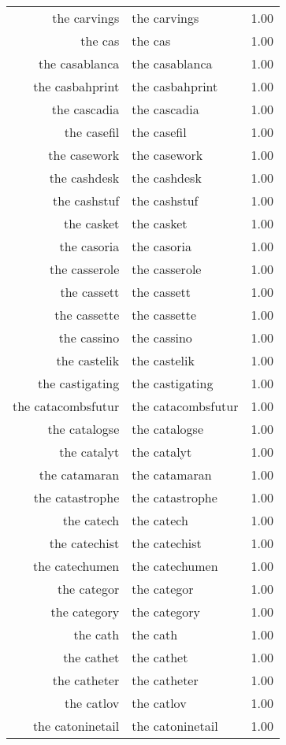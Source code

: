 \begin{table}[ht]
\begin{tabular}{rlr}
  the carvings & the carvings & 1.00 \\ 
  the cas & the cas & 1.00 \\ 
  the casablanca & the casablanca & 1.00 \\ 
  the casbahprint & the casbahprint & 1.00 \\ 
  the cascadia & the cascadia & 1.00 \\ 
  the casefil & the casefil & 1.00 \\ 
  the casework & the casework & 1.00 \\ 
  the cashdesk & the cashdesk & 1.00 \\ 
  the cashstuf & the cashstuf & 1.00 \\ 
  the casket & the casket & 1.00 \\ 
  the casoria & the casoria & 1.00 \\ 
  the casserole & the casserole & 1.00 \\ 
  the cassett & the cassett & 1.00 \\ 
  the cassette & the cassette & 1.00 \\ 
  the cassino & the cassino & 1.00 \\ 
  the castelik & the castelik & 1.00 \\ 
  the castigating & the castigating & 1.00 \\ 
  the catacombsfutur & the catacombsfutur & 1.00 \\ 
  the catalogse & the catalogse & 1.00 \\ 
  the catalyt & the catalyt & 1.00 \\ 
  the catamaran & the catamaran & 1.00 \\ 
  the catastrophe & the catastrophe & 1.00 \\ 
  the catech & the catech & 1.00 \\ 
  the catechist & the catechist & 1.00 \\ 
  the catechumen & the catechumen & 1.00 \\ 
  the categor & the categor & 1.00 \\ 
  the category & the category & 1.00 \\ 
  the cath & the cath & 1.00 \\ 
  the cathet & the cathet & 1.00 \\ 
  the catheter & the catheter & 1.00 \\ 
  the catlov & the catlov & 1.00 \\ 
  the catoninetail & the catoninetail & 1.00 \\ 

\end{tabular}
\end{table}

